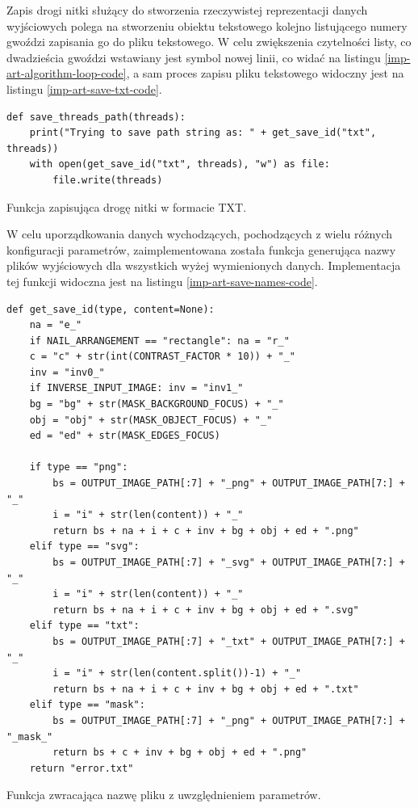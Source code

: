 \documentclass[a4paper, 12pt, polish, twoside]{extreport}
\begin{document}
        Zapis drogi nitki służący do stworzenia rzeczywistej reprezentacji danych wyjściowych polega na stworzeniu obiektu tekstowego kolejno listującego numery gwoździ zapisania go do pliku tekstowego. W celu zwiększenia czytelności listy, co dwadzieścia gwoździ wstawiany jest symbol nowej linii, co widać na listingu \ref{imp-art-algorithm-loop-code}, a sam proces zapisu pliku tekstowego widoczny jest na listingu \ref{imp-art-save-txt-code}.
        \begin{code}[H]
        \begin{verbatim}
def save_threads_path(threads):
    print("Trying to save path string as: " + get_save_id("txt", threads))
    with open(get_save_id("txt", threads), "w") as file:
        file.write(threads)
        \end{verbatim}
        \caption{Funkcja zapisująca drogę nitki w formacie TXT.}
        \label{imp-art-save-txt-code}
        \end{code}

        
        W celu uporządkowania danych wychodzących, pochodzących z wielu różnych konfiguracji parametrów, zaimplementowana została funkcja generująca nazwy plików wyjściowych dla wszystkich wyżej wymienionych danych. Implementacja tej funkcji widoczna jest na listingu \ref{imp-art-save-names-code}.
        \begin{code}[H]
        \begin{verbatim}
def get_save_id(type, content=None):
    na = "e_"
    if NAIL_ARRANGEMENT == "rectangle": na = "r_"
    c = "c" + str(int(CONTRAST_FACTOR * 10)) + "_"
    inv = "inv0_"
    if INVERSE_INPUT_IMAGE: inv = "inv1_"
    bg = "bg" + str(MASK_BACKGROUND_FOCUS) + "_"
    obj = "obj" + str(MASK_OBJECT_FOCUS) + "_"
    ed = "ed" + str(MASK_EDGES_FOCUS)

    if type == "png":
        bs = OUTPUT_IMAGE_PATH[:7] + "_png" + OUTPUT_IMAGE_PATH[7:] + "_"
        i = "i" + str(len(content)) + "_"
        return bs + na + i + c + inv + bg + obj + ed + ".png"
    elif type == "svg":
        bs = OUTPUT_IMAGE_PATH[:7] + "_svg" + OUTPUT_IMAGE_PATH[7:] + "_"
        i = "i" + str(len(content)) + "_"
        return bs + na + i + c + inv + bg + obj + ed + ".svg"
    elif type == "txt":
        bs = OUTPUT_IMAGE_PATH[:7] + "_txt" + OUTPUT_IMAGE_PATH[7:] + "_"
        i = "i" + str(len(content.split())-1) + "_"
        return bs + na + i + c + inv + bg + obj + ed + ".txt"
    elif type == "mask":
        bs = OUTPUT_IMAGE_PATH[:7] + "_png" + OUTPUT_IMAGE_PATH[7:] + "_mask_"
        return bs + c + inv + bg + obj + ed + ".png"
    return "error.txt"
        \end{verbatim}
        \caption{Funkcja zwracająca nazwę pliku z uwzględnieniem parametrów.}
        \label{imp-art-save-names-code}
        \end{code}
\end{document}

